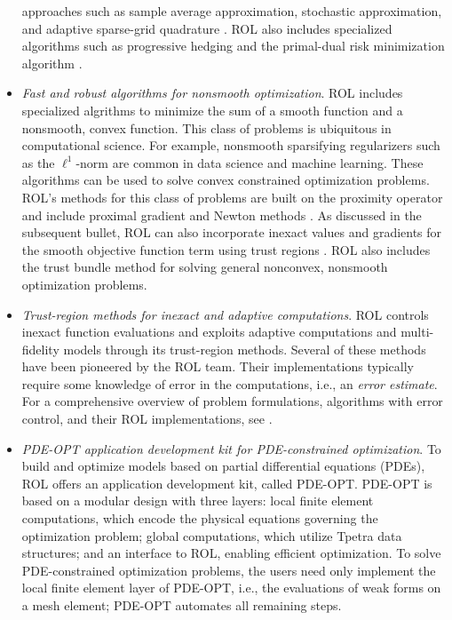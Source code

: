 \begin{itemize}
approaches such as sample average approximation, stochastic approximation, and
adaptive sparse-grid quadrature \cite{kouri2013trust,kouri2014inexact}. ROL
also includes specialized algorithms such as progressive hedging
\cite{rockafellar1991scenarios} and the primal-dual risk minimization algorithm
\cite{kouri2022primal}.
\item
\emph{Fast and robust algorithms for nonsmooth optimization}.
ROL includes specialized algrithms to minimize the sum of a smooth function
and a nonsmooth, convex function.  This class of problems is ubiquitous in
computational science.  For example, nonsmooth sparsifying regularizers such as
the $\ell^1$-norm are common in data science and machine learning.  These
algorithms can be used to solve convex constrained optimization problems.
ROL's methods for this class of problems are built on the proximity operator
and include proximal gradient and Newton methods
\cite{beck2017first,kanzow2021globalized,ochs2014iPiano}.
As discussed in the subsequent bullet, ROL can also incorporate inexact
values and gradients for the smooth objective function term using trust regions
\cite{baraldi2023proximal}.
ROL also includes the trust bundle method \cite{schramm1992bundle}
for solving general nonconvex, nonsmooth optimization problems.
\item
\emph{Trust-region methods for inexact and adaptive computations}.
ROL controls inexact function evaluations and exploits adaptive computations
and multi-fidelity models through its trust-region methods. Several of these methods
have been pioneered by the ROL team.  Their implementations typically require some
knowledge of error in the computations, i.e., an \emph{error estimate}.
For a comprehensive overview of problem formulations, algorithms with error control,
and their ROL implementations, see \cite{Kouri2018}.
\item
\emph{PDE-OPT application development kit for PDE-constrained optimization}.
To build and optimize models based on partial differential equations (PDEs),
ROL offers an application development kit, called PDE-OPT. PDE-OPT is based on a
modular design with three layers: local finite element computations,
which encode the physical equations governing the optimization problem;
global computations, which utilize Tpetra data structures;
and an interface to ROL, enabling efficient optimization.
To solve PDE-constrained optimization problems, the users need only implement the
local finite element layer of PDE-OPT, i.e., the evaluations of weak forms on
a mesh element; PDE-OPT automates all remaining steps.
\end{itemize}



